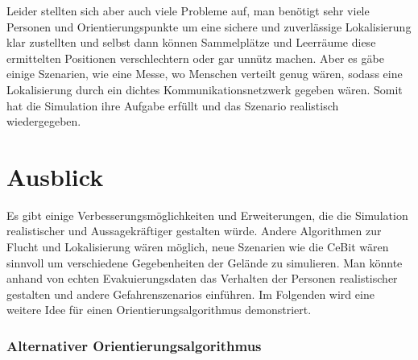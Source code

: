 Leider stellten sich aber auch viele Probleme auf, man benötigt sehr viele Personen und Orientierungspunkte um eine sichere und zuverlässige Lokalisierung klar zustellten und selbst dann können Sammelplätze und Leerräume diese ermittelten Positionen verschlechtern oder gar unnütz machen. Aber es gäbe einige Szenarien, wie eine Messe, wo Menschen verteilt genug wären, sodass eine Lokalisierung durch ein dichtes Kommunikationsnetzwerk gegeben wären. Somit hat die Simulation ihre Aufgabe erfüllt und das Szenario realistisch wiedergegeben.

\section{Ausblick}
Es gibt einige Verbesserungsmöglichkeiten und Erweiterungen, die die Simulation realistischer und Aussagekräftiger gestalten würde. Andere Algorithmen zur Flucht und Lokalisierung wären möglich, neue Szenarien wie die CeBit wären sinnvoll um verschiedene Gegebenheiten der Gelände zu simulieren. Man könnte anhand von echten Evakuierungsdaten das Verhalten der Personen realistischer gestalten und andere Gefahrenszenarios einführen. Im Folgenden wird eine weitere Idee für einen Orientierungsalgorithmus demonstriert.

\subsubsection{Alternativer Orientierungsalgorithmus}
\label{sec:bug-0}

